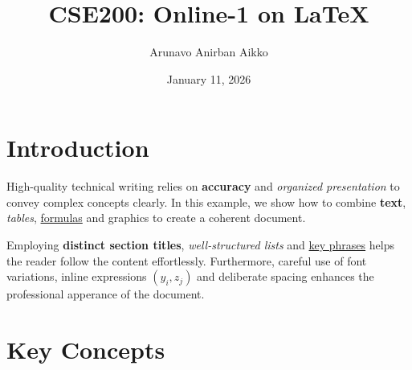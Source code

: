 \documentclass{article}
\title{CSE200: Online-1 on \LaTeX}
\author{Arunavo Anirban Aikko}
\date{January 11, 2026}
\begin{document}
\maketitle

\section{Introduction}
High-quality technical writing relies on \textbf{accuracy} and \emph{organized presentation} to convey complex concepts clearly. In this example, we show how to combine \textbf{text}, \textit{tables}, \underline{formulas} and {\large graphics} to create a coherent document.

Employing \textbf{distinct section titles}, \textit{well-structured lists} and \underline{key phrases} helps the reader follow the content effortlessly. Furthermore, careful use of {\small font variations}, inline expressions $(y_i, z_j)$ and deliberate spacing enhances the professional apperance of the document.

\section{Key Concepts}
\end{document}
